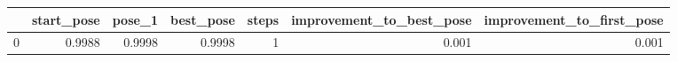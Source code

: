 \begin{tabular}{lrrrrrr}
\toprule
{} &  start\_pose &  pose\_1 &  best\_pose &  steps &  improvement\_to\_best\_pose &  improvement\_to\_first\_pose \\
\midrule
0 &      0.9988 &  0.9998 &     0.9998 &      1 &                     0.001 &                      0.001 \\
\bottomrule
\end{tabular}
